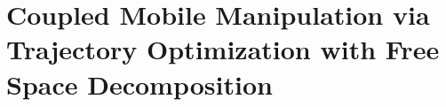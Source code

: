 \chapter{Coupled Mobile Manipulation via Trajectory Optimization with Free Space
Decomposition}
\label{icra_spahn_21}





\newpage


%











\newpage
